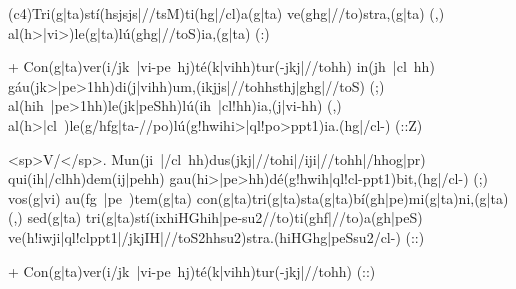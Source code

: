 (c4)Tri(g|ta)stí(hsjsjs|//tsM)ti(hg|/cl)a(g|ta) ve(ghg|//to)stra,(g|ta) (,) 
al(h>|vi>)le(g|ta)lú(ghg|//toS)ia,(g|ta) (:) 

+ 
Con(g|ta)ver(i/jk~|vi-pe~hj)té(k|vihh)tur(-jkj|//tohh) in(jh~|cl~hh) gáu(jk>|pe>1hh)di(j|vihh)um,(ikjjs|//tohhsthj|ghg|//toS) (;) 
al(hih~|pe>1hh)le(jk|peShh)lú(ih~|cl!hh)ia,(j|vi-hh) (,) al(h>|cl~)le(g/hfg|ta-//po)lú(g!hwihi>|ql!po>ppt1)ia.(hg|/cl-) (::Z)

<sp>V/</sp>. 
Mun(ji~|/cl~hh)dus(jkj|//tohi|/iji|//tohh|/hhog|pr)  qui(ih|/clhh)dem(ij|pehh) gau(hi>|pe>hh)dé(g!hwih|ql!cl-ppt1)bit,(hg|/cl-) (;) vos(g|vi) au(fg~|pe~)tem(g|ta) con(g|ta)tri(g|ta)sta(g|ta)bí(gh|pe)mi(g|ta)ni,(g|ta) (,) 
sed(g|ta) tri(g|ta)stí(ixhiHGhih|pe-su2//to)ti(ghf|//to)a(gh|peS) ve(h!iwji|ql!clppt1|/jkjIH|//toS2hhsu2)stra.(hiHGhg|peSsu2/cl-) (::)

+ 
Con(g|ta)ver(i/jk~|vi-pe~hj)té(k|vihh)tur(-jkj|//tohh) (::)